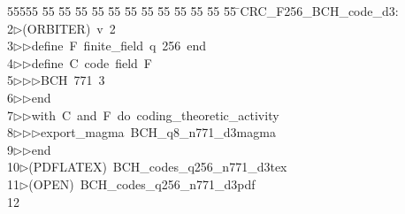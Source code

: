 %
%
\begin{tabbing}
55555 \= 55 \= 55 \= 55 \= 55 \= 55 \= 55 \= 55 \= 55 \= 55 \= 55 \= 55 \= 55 \= \>CRC\_F256\_BCH\_code\_d3:\\[0pt]
2\>$\triangleright$\>(ORBITER)\ v\ 2\ \\[0pt]
3\>$\triangleright$\>$\triangleright$\>define\ F\ finite\_field\ q\ 256\ end\ \\[0pt]
4\>$\triangleright$\>$\triangleright$\>define\ C\ code\ field\ F\ \\[0pt]
5\>$\triangleright$\>$\triangleright$\>$\triangleright$\>BCH\ 771\ 3\ \\[0pt]
6\>$\triangleright$\>$\triangleright$\>end\ \\[0pt]
7\>$\triangleright$\>$\triangleright$\>with\ C\ and\ F\ do\ coding\_theoretic\_activity\ \\[0pt]
8\>$\triangleright$\>$\triangleright$\>$\triangleright$\>export\_magma\ BCH\_q8\_n771\_d3magma\ \\[0pt]
9\>$\triangleright$\>$\triangleright$\>end\\[0pt]
10\>$\triangleright$\>(PDFLATEX)\ BCH\_codes\_q256\_n771\_d3tex\\[0pt]
11\>$\triangleright$\>(OPEN)\ BCH\_codes\_q256\_n771\_d3pdf\\[0pt]
12\>\end{tabbing}
